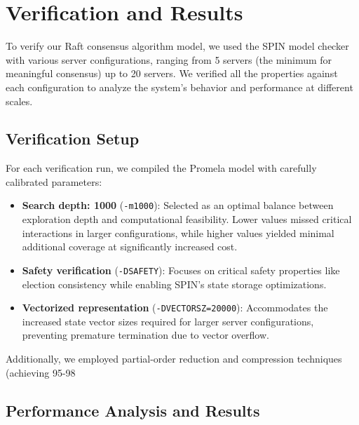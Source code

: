 \chapter{Verification and Results}
\label{sec:verification_results}

To verify our Raft consensus algorithm model, we used the SPIN model checker with various server configurations, ranging from 5 servers (the minimum for meaningful consensus) up to 20 servers. We verified all the properties  against each configuration to analyze the system's behavior and performance at different scales.

\section{Verification Setup}
\label{sec:verification_setup}

For each verification run, we compiled the Promela model with carefully calibrated parameters:
\begin{itemize}
    \item \textbf{Search depth: 1000} (\texttt{-m1000}): Selected as an optimal balance between exploration depth and computational feasibility. Lower values missed critical interactions in larger configurations, while higher values yielded minimal additional coverage at significantly increased cost.
    
    \item \textbf{Safety verification} (\texttt{-DSAFETY}): Focuses on critical safety properties like election consistency while enabling SPIN's state storage optimizations.
    
    \item \textbf{Vectorized representation} (\texttt{-DVECTORSZ=20000}): Accommodates the increased state vector sizes required for larger server configurations, preventing premature termination due to vector overflow.
\end{itemize}

Additionally, we employed partial-order reduction and compression techniques (achieving 95-98%

\section{Performance Analysis and Results}
\label{sec:performance_analysis}

